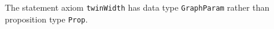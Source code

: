 The statement axiom \verb|twinWidth| has data type \verb|GraphParam| rather
than proposition type \verb|Prop|.
